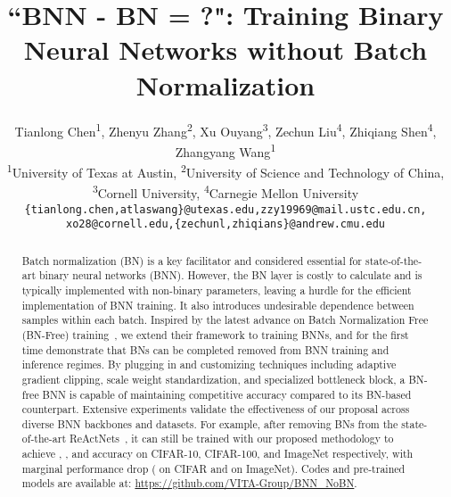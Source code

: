 \documentclass[final]{cvpr}
\newcommand{\PaperTitle}{``BNN - BN = ?": Training Binary Neural Networks without Batch Normalization}
\begin{document}
\title{\PaperTitle}

\author{Tianlong Chen\textsuperscript{1}, Zhenyu Zhang\textsuperscript{2}, Xu Ouyang\textsuperscript{3}, Zechun Liu\textsuperscript{4}, Zhiqiang Shen\textsuperscript{4}, Zhangyang Wang\textsuperscript{1}\\
  \textsuperscript{1}University of Texas at Austin, \textsuperscript{2}University of Science and Technology of China, \\ \textsuperscript{3}Cornell University, \textsuperscript{4}Carnegie Mellon University \\
  \small{\texttt{\{tianlong.chen,atlaswang\}@utexas.edu,zzy19969@mail.ustc.edu.cn,}} \\
  \small{\texttt{xo28@cornell.edu,\{zechunl,zhiqians\}@andrew.cmu.edu}}
}

\maketitle

\begin{abstract}
Batch normalization (BN) is a key facilitator and considered 
essential for state-of-the-art binary neural networks (BNN). However, the BN layer is costly to calculate and is typically implemented with non-binary parameters, leaving a hurdle for the efficient implementation of BNN training. It also introduces undesirable dependence between samples within each batch. Inspired by the latest advance on Batch Normalization Free (BN-Free) training~\cite{brock2021agc}, we extend their framework to training BNNs, and for the first time demonstrate that BNs can be completed removed from BNN training and inference regimes. By plugging in and customizing techniques including adaptive gradient clipping, scale weight standardization, and specialized bottleneck block, a BN-free BNN is capable of maintaining competitive accuracy compared to its BN-based counterpart. Extensive experiments validate the effectiveness of our proposal across diverse BNN backbones and datasets. For example, after removing BNs from the state-of-the-art ReActNets~\cite{liu2020reactnet}, it can still be trained with our proposed methodology to achieve , , and  accuracy on CIFAR-10, CIFAR-100, and ImageNet respectively, with marginal performance drop ( on CIFAR and  on ImageNet). Codes and pre-trained models are available at: \small{\url{https://github.com/VITA-Group/BNN_NoBN}}.
\vspace{-1em}
\end{abstract}
\end{document}
